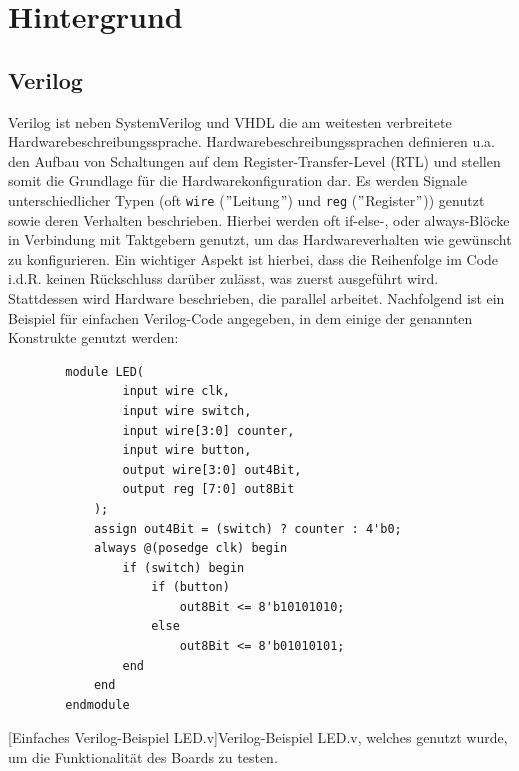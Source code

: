 \chapter{Hintergrund}

\section{Verilog}
    Verilog ist neben SystemVerilog und VHDL die am weitesten verbreitete Hardwarebeschreibungssprache.
    Hardwarebeschreibungssprachen definieren u.a. den Aufbau von Schaltungen auf dem Register-Transfer-Level (RTL) und stellen somit die Grundlage für die Hardwarekonfiguration dar.
    Es werden Signale unterschiedlicher Typen (oft \verb|wire| (\("\)Leitung\("\)) und \verb|reg| (\("\)Register\("\))) genutzt sowie deren Verhalten beschrieben.
    Hierbei werden oft if-else-, oder always-Blöcke in Verbindung mit Taktgebern genutzt, um das Hardwareverhalten wie gewünscht zu konfigurieren.
    Ein wichtiger Aspekt ist hierbei, dass die Reihenfolge im Code i.d.R. keinen Rückschluss darüber zulässt, was zuerst ausgeführt wird.
    Stattdessen wird Hardware beschrieben, die parallel arbeitet.
    Nachfolgend ist ein Beispiel für einfachen Verilog-Code angegeben, in dem einige der genannten Konstrukte genutzt werden:

    \begin{verbatim}
        module LED(
                input wire clk,
                input wire switch,
                input wire[3:0] counter,
                input wire button,
                output wire[3:0] out4Bit,
                output reg [7:0] out8Bit
            );
            assign out4Bit = (switch) ? counter : 4'b0;
            always @(posedge clk) begin
                if (switch) begin
                    if (button)
                        out8Bit <= 8'b10101010;
                    else
                        out8Bit <= 8'b01010101;
                end
            end
        endmodule
    \end{verbatim}
    [Einfaches Verilog-Beispiel LED.v]{Verilog-Beispiel LED.v, welches genutzt wurde, um die Funktionalität des Boards zu testen.}
    \label{lst:LED.v}


